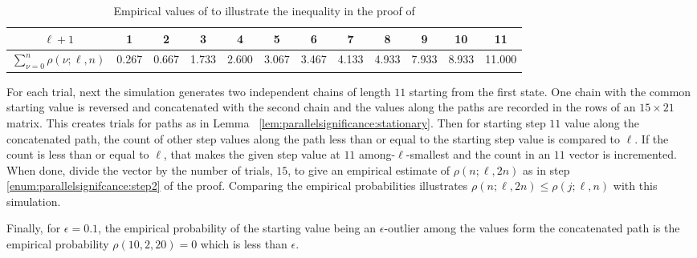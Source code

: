 \documentclass[12pt]{article}
\begin{document}
\begin{example}
    \begin{table}
        \centering
        \begin{tabular}{c|ccccccccccc}
            \( \ell +1 \)                           & 1     & 2     & 3     & 4     & 5     & 6     & 7     & 8     & 9     & 10    & 11     \\ 
            \hline
            \( \sum_{\nu=0}^n \rho(\nu; \ell, n) \) & 0.267 & 0.667 & 1.733 & 2.600 & 3.067 & 3.467 & 4.133 & 4.933 & 7.933 & 8.933 & 11.000 \\ 
        \end{tabular}
        \caption{Empirical values of to illustrate the inequality in the
        proof of }%
        \label{tab:parallelsignificance:sumofrhoprobs}
    \end{table}

    For each trial, next the simulation generates two independent chains
    of length \( 11 \) starting from the first state.  One chain with
    the common starting value is reversed and concatenated with the
    second chain and the values along the paths are recorded in the rows
    of an \( 15 \times 21 \) matrix.  This creates trials for paths as
    in Lemma~%
    \ref{lem:parallelsignificance:stationary}. Then for starting step \(
    11 \) value along the concatenated path, the count of other step
    values along the path less than or equal to the starting step value
    is compared to \( \ell \).  If the count is less than or equal to \(
    \ell \), that makes the given step value at \( 11 \) among-\( \ell \)-smallest
    and the count in an \( 11 \) vector is incremented.  When done,
    divide the vector by the number of trials, \( 15 \), to give an
    empirical estimate of \( \rho(n; \ell , 2n) \) as in step~%
    \ref{enum:parallelsignifcance:step2} of the proof. Comparing the
    empirical probabilities illustrates \( \rho(n; \ell, 2n) \le \rho(j;
    \ell, n) \) with this simulation.

    Finally, for \( \epsilon = 0.1 \), the empirical probability of the
    starting value being an \( \epsilon \)-outlier among the values form
    the concatenated path is the empirical probability \( \rho(10, 2, 20)
    = 0 \) which is less than \( \epsilon \).
\end{example}
\end{document}
